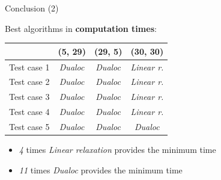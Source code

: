 \documentclass{beamer}
\begin{document}
	\begin{frame}{Conclusion (2)}
	
	Best algorithms in \textbf{computation times}:
	
	\begin{table}
	\begin{tabular}{| l | ccc |}
	\hline
     & (5, 29) & (29, 5) & (30, 30) \\
    \hline
        \rowcolor{shadecolor}
        Test case 1 & \textit{Dualoc} & \textit{Dualoc} & \textit{Linear r.} \\
        Test case 2 & \textit{Dualoc} & \textit{Dualoc} & \textit{Linear r.} \\
        \rowcolor{shadecolor}
        Test case 3 & \textit{Dualoc} & \textit{Dualoc} & \textit{Linear r.} \\
        Test case 4 & \textit{Dualoc} & \textit{Dualoc} & \textit{Linear r.} \\
        \rowcolor{shadecolor}
        Test case 5 & \textit{Dualoc} & \textit{Dualoc} & \textit{Dualoc} \\
    \hline
    \end{tabular}
    \end{table}
    
    \begin{itemize}
        \item \textit{4} times \textit{Linear relaxation} provides the minimum time
        \item \textit{11} times \textit{Dualoc} provides the minimum time
    \end{itemize}
    
	\end{frame}
\end{document}
